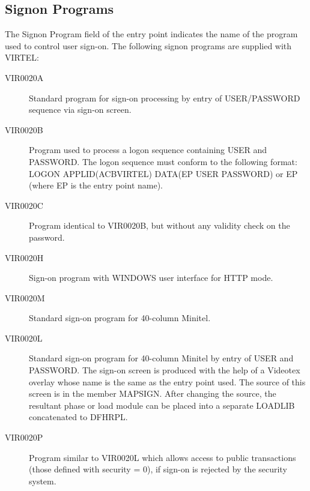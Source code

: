 \documentclass[letterpaper,10pt,english]{sphinxmanual}
\begin{document}
\subsection{Signon Programs}
\label{\detokenize{connectivity_guide:signon-programs}}\label{\detokenize{connectivity_guide:index-110}}
The Signon Program field of the entry point indicates the name of the program used to control user sign-on. The following signon programs are supplied with VIRTEL:
\begin{description}
\item[{VIR0020A}] \leavevmode
Standard program for sign-on processing by entry of USER/PASSWORD sequence via sign-on screen.

\item[{VIR0020B}] \leavevmode
Program used to process a logon sequence containing USER and PASSWORD. The logon sequence must conform to the following format: LOGON APPLID(ACBVIRTEL) DATA(EP USER PASSWORD) or EP (where EP is the entry point name).

\item[{VIR0020C}] \leavevmode
Program identical to VIR0020B, but without any validity check on the password.

\item[{VIR0020H}] \leavevmode
Sign-on program with WINDOWS user interface for HTTP mode.

\item[{VIR0020M}] \leavevmode
Standard sign-on program for 40-column Minitel.

\item[{VIR0020L}] \leavevmode
Standard sign-on program for 40-column Minitel by entry of USER and PASSWORD. The sign-on screen is produced with the help of a Videotex overlay whose name is the same as the entry point used. The source of this screen is in the member MAPSIGN. After changing the source, the resultant phase or load module can be placed into a separate LOADLIB concatenated to DFHRPL.

\item[{VIR0020P}] \leavevmode
Program similar to VIR0020L which allows access to public transactions (those defined with security = 0), if sign-on is rejected by the security system.

\end{description}

\ignorespaces 
\end{document}
